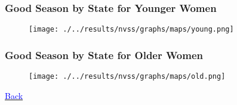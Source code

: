 \documentclass[10pt,letterpaper,subeqn]{beamer}
\begin{document}
\begin{frame}[label=USyoung]
  \frametitle{Good Season by State for Younger Women}
  \begin{figure}[htpb!]
    \begin{center}
      \centering
      \texttt{[image: ./../results/nvss/graphs/maps/young.png]}
      \label{fig:mapYoung}
    \end{center}
  \end{figure}
\end{frame}

\begin{frame}[label=USold]
  \frametitle{Good Season by State for Older Women}
  \begin{figure}[htpb!]
    \begin{center}
      \centering
      \texttt{[image: ./../results/nvss/graphs/maps/old.png]}
      \label{fig:mapOld}
    \end{center}
  \end{figure}
\hyperlink{weather}{\textcolor{blue}{Back}}
\end{frame}
\end{document}
